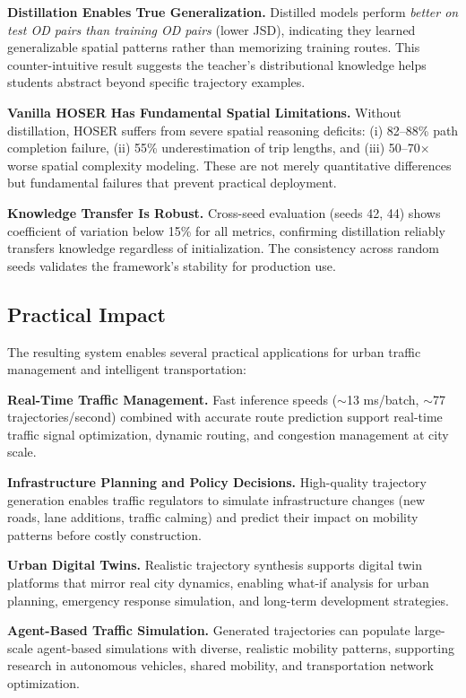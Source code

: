 \textbf{Distillation Enables True Generalization.} Distilled models perform \emph{better on test OD pairs than training OD pairs} (lower JSD), indicating they learned generalizable spatial patterns rather than memorizing training routes. This counter-intuitive result suggests the teacher's distributional knowledge helps students abstract beyond specific trajectory examples.

\textbf{Vanilla HOSER Has Fundamental Spatial Limitations.} Without distillation, HOSER suffers from severe spatial reasoning deficits: (i) 82--88\% path completion failure, (ii) 55\% underestimation of trip lengths, and (iii) 50--70$\times$ worse spatial complexity modeling. These are not merely quantitative differences but fundamental failures that prevent practical deployment.

\textbf{Knowledge Transfer Is Robust.} Cross-seed evaluation (seeds 42, 44) shows coefficient of variation below 15\% for all metrics, confirming distillation reliably transfers knowledge regardless of initialization. The consistency across random seeds validates the framework's stability for production use.

\subsection{Practical Impact}
\label{sec:conclusion-impact}

The resulting system enables several practical applications for urban traffic management and intelligent transportation:

\textbf{Real-Time Traffic Management.} Fast inference speeds ($\sim$13 ms/batch, $\sim$77 trajectories/second) combined with accurate route prediction support real-time traffic signal optimization, dynamic routing, and congestion management at city scale.

\textbf{Infrastructure Planning and Policy Decisions.} High-quality trajectory generation enables traffic regulators to simulate infrastructure changes (new roads, lane additions, traffic calming) and predict their impact on mobility patterns before costly construction.

\textbf{Urban Digital Twins.} Realistic trajectory synthesis supports digital twin platforms that mirror real city dynamics, enabling what-if analysis for urban planning, emergency response simulation, and long-term development strategies.

\textbf{Agent-Based Traffic Simulation.} Generated trajectories can populate large-scale agent-based simulations with diverse, realistic mobility patterns, supporting research in autonomous vehicles, shared mobility, and transportation network optimization.

